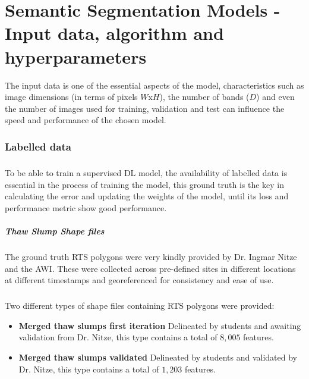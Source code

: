 \chapter{Semantic Segmentation Models - Input data, algorithm and hyperparameters} \label{input_data_section}
The input data is one of the essential aspects of the model, characteristics such as image dimensions (in terms of pixels $W$x$H$), the number of bands ($D$) and even the number of images used for training, validation and test can influence the speed and performance of the chosen model.

\subsection{Labelled data} \label{labeled_data}
\paragraph{}
To be able to train a supervised \gls{DL} model, the availability of labelled data is essential in the process of training the model, this ground truth is the key in calculating the error and updating the weights of the model, until its loss and performance metric show good performance.

\paragraph{Thaw Slump Shape files}
The ground truth \gls{RTS} polygons were very kindly provided by Dr. Ingmar Nitze and the \gls{AWI}. These were collected across pre-defined sites in different locations at different timestamps and georeferenced for consistency and ease of use.

\paragraph{}
Two different types of shape files containing \gls{RTS} polygons were provided:
\begin{itemize}
    \item \textbf{Merged thaw slumps first iteration} Delineated by students and awaiting validation from Dr. Nitze, this type contains a total of $8,005$ features.
    \item \textbf{Merged thaw slumps validated} Delineated by students and validated by Dr. Nitze, this type contains a total of $1,203$ features.
\end{itemize}

